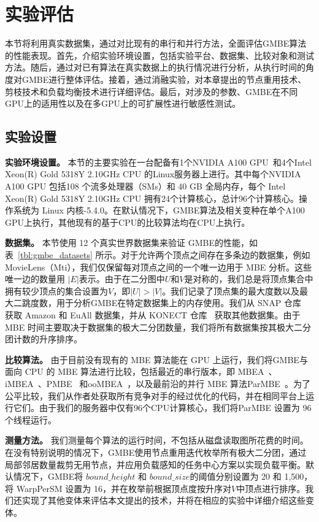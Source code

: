 \section{实验评估}
本节将利用真实数据集，通过对比现有的串行和并行方法，全面评估GMBE算法的性能表现。首先，介绍实验环境设置，包括实验平台、数据集、比较对象和测试方法。随后，通过对已有算法在真实数据上的执行情况进行分析，从执行时间的角度对GMBE进行整体评估。接着，通过消融实验，对本章提出的节点重用技术、剪枝技术和负载均衡技术进行详细评估。最后，对涉及的参数、GMBE在不同GPU上的适用性以及在多GPU上的可扩展性进行敏感性测试。

\subsection{实验设置}

\textbf{实验环境设置。} 本节的主要实验在一台配备有1个NVIDIA A100 GPU~\cite{NVIDIA-A100}和4个Intel Xeon(R) Gold 5318Y 2.10GHz CPU 的Linux服务器上进行。其中每个NVIDIA A100 GPU 包括108 个流多处理器（SMs）和 40 GB 全局内存，每个 Intel Xeon(R) Gold 5318Y 2.10GHz CPU 拥有24个计算核心，总计96个计算核心。操作系统为 Linux 内核-5.4.0。在默认情况下，GMBE算法及相关变种在单个A100 GPU上执行，其他现有的基于CPU的比较算法均在CPU上执行。



\textbf{数据集。} 本节使用 12 个真实世界数据集来验证 GMBE的性能，如表~\ref{tbl:gmbe_datasets} 所示。对于允许两个顶点之间存在多条边的数据集，例如 MovieLens（Mti），我们仅保留每对顶点之间的一个唯一边用于 MBE 分析。这些唯一边的数量用 $|E|$表示。由于在二分图中$U$和$V$是对称的，我们总是将顶点集合中拥有较少顶点的集合设置为$V$，即$|U|>|V|$。我们记录了顶点集的最大度数以及最大二跳度数，用于分析GMBE在特定数据集上的内存使用。我们从 SNAP 仓库~\cite{snapnets} 获取 Amazon 和 EuAll 数据集，并从 KONECT 仓库~\cite{konect} 获取其他数据集。由于 MBE 时间主要取决于数据集的极大二分团数量，我们将所有数据集按其极大二分团计数的升序排序。%

\textbf{比较算法。} 由于目前没有现有的 MBE 算法能在 GPU 上运行，我们将GMBE与面向 CPU 的 MBE 算法进行比较，包括最近的串行版本，即 MBEA~\cite{iMBEA14}、iMBEA~\cite{iMBEA14}、PMBE~\cite{PMBE20} 和ooMBEA~\cite{ooMBE22}，以及最前沿的并行 MBE 算法ParMBE~\cite{parMBE18}。为了公平比较，我们从作者处获取所有竞争对手的经过优化的代码，并在相同平台上运行它们。由于我们的服务器中仅有96个CPU计算核心，我们将ParMBE 设置为 96 个线程运行。

\textbf{测量方法。} 我们测量每个算法的运行时间，不包括从磁盘读取图所花费的时间。在没有特别说明的情况下，GMBE使用节点重用迭代枚举所有极大二分团，通过局部邻居数量裁剪无用节点，并应用负载感知的任务中心方案以实现负载平衡。默认情况下，GMBE将 $bound\_height$ 和 $bound\_size$的阈值分别设置为 20 和 1,500，将 \textsf{WarpPerSM} 设置为 16，并在枚举前根据顶点度按升序对$V$中顶点进行排序。我们还实现了其他变体来评估本文提出的技术，并将在相应的实验中详细介绍这些变体。


